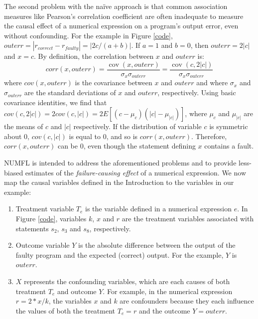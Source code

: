 The second problem with the na\"{i}ve approach is that common association measures like Pearson's correlation coefficient \cite{Philip2012} are often inadequate to measure the causal effect of a numerical expression on a program's output error, even without confounding.  For the example in Figure \ref{code},  $outerr=|r_{correct}-r_{faulty} |=|2c/(a+b)|$.  If $a=1$ and $b=0$, then $outerr=2|c|$ and $x=c$.  By definition, the correlation between $x$ and $outerr$ is:
\begin{equation*}\label{correlation}
corr(x,outerr) = \frac{{{\mathop{ cov}} (x,outerr)}}{{{\sigma _x}{\sigma _{outerr}}}} = \frac{{{\mathop{ cov}} (c,2|c|)}}{{{\sigma _x}{\sigma _{outerr}}}}
\end{equation*}
where $cov(x,outerr)$ is the covariance between $x$ and $outerr$ and where $\sigma_x$ and $\sigma_{outerr}$ are the standard deviations of $x$ and $outerr$, respectively.  Using basic covariance identities, we find that $cov(c,2|c|)=2cov(c,|c|)=2E[(c-\mu_c )(|c|-\mu_{|c|})]$, where $\mu_c$ and $\mu_{|c|}$ are the means of $c$ and $|c|$ respectively.  If the distribution of variable $c$ is symmetric about 0, $cov(c,|c|)$ is equal to 0, and so is $corr(x,outerr)$. Therefore, $corr(x,outerr)$ can be 0, even though the statement defining $x$ contains a fault.

NUMFL is intended to address the aforementioned problems and to provide less-biased estimates of the {\it failure-causing effect} of a numerical expression.  We now map the causal variables defined in the Introduction to the variables in our example:
\begin{enumerate}
\item 	Treatment variable $T_e$ is the variable defined in a numerical expression $e$.  In Figure \ref{code}, variables $k$, $x$ and $r$ are the treatment variables associated with statements $s_2$, $s_3$ and $s_8$, respectively.
	\item Outcome variable $Y$ is the absolute difference between the output of the faulty program and the expected (correct) output.  For the example, $Y$ is $outerr$.
\item $X$ represents the confounding variables, which are each causes of both treatment $T_e$ and outcome $Y$. For example, in the numerical expression $r=2*x/k$, the variables $x$ and $k$ are confounders because they each influence the values of both the treatment $T_e=r$ and the outcome $Y=outerr$.

\end{enumerate}

